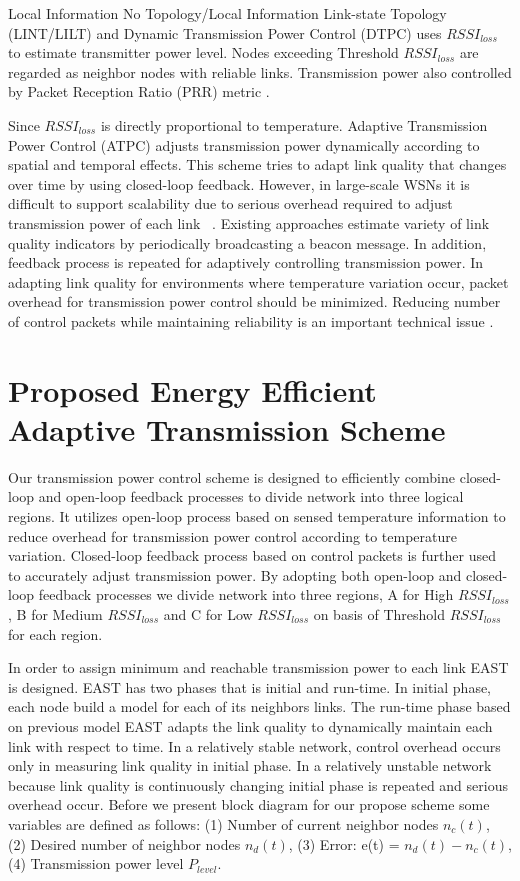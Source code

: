 \documentclass{article}
\begin{document}
Local Information No Topology/Local Information Link-state Topology (LINT/LILT) and Dynamic Transmission Power Control (DTPC) uses $RSSI_{loss}$ to estimate transmitter power level. Nodes exceeding Threshold $RSSI_{loss}$  are regarded as neighbor nodes with reliable links. Transmission power also controlled by Packet Reception Ratio (PRR) metric \cite{3}.


Since $RSSI_{loss}$ is directly proportional to temperature. Adaptive Transmission Power Control (ATPC) adjusts transmission power dynamically according to spatial and temporal effects. This scheme tries to adapt link quality that changes over time by using closed-loop feedback. However, in large-scale WSNs it is difficult to support scalability due to serious overhead required to adjust transmission power of each link ~\cite{4}. Existing approaches estimate variety of link quality indicators by periodically broadcasting a beacon message. In addition, feedback process is repeated for adaptively controlling transmission power. In adapting link quality for environments where temperature variation occur, packet overhead for transmission power control should be minimized. Reducing number of control packets while maintaining reliability is an important technical issue \cite{5}.

\section{Proposed Energy Efficient Adaptive Transmission Scheme}
\label{sec:pagestyle}

Our transmission power control scheme is designed to efficiently combine closed-loop and open-loop feedback processes to divide network into three logical regions. It utilizes open-loop process based on sensed temperature information to reduce overhead for transmission power control according to temperature variation. Closed-loop feedback process based on control packets is further used to accurately adjust transmission power. By adopting both open-loop and closed-loop feedback processes we divide network into three regions, A for High $RSSI_{loss}$, B for Medium $RSSI_{loss}$ and  C for Low $RSSI_{loss}$  on basis of Threshold $RSSI_{loss}$  for each region.

In order to assign minimum and reachable transmission power to each link EAST is designed. EAST has two phases that is initial and run-time. In initial phase, each node build a model for each of its neighbors links. The run-time phase based on previous model EAST adapts the link quality to dynamically maintain each link with respect to time. In a relatively stable network, control overhead occurs only in measuring link quality in initial phase. In a relatively unstable network because link quality is continuously changing initial phase is repeated and serious overhead occur. Before we present block diagram for our propose scheme some variables are defined as follows: (1) Number of current neighbor nodes $n_{c}(t)$, (2) Desired number of neighbor nodes $n_{d}(t)$, (3) Error: e(t) = $n_{d}(t) - n_{c}(t)$,(4) Transmission power level $P_{level}$.
\end{document}
